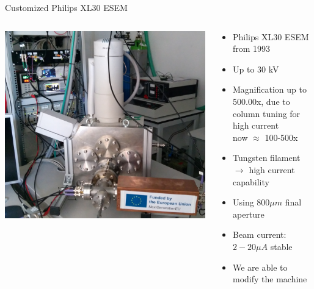 \documentclass[final]{beamer}
\begin{document}
\begin{frame}[fragile]{}
\begin{columns}[T]
\begin{column}{.49\linewidth}
\begin{block}{\Large Customized Philips XL30 ESEM}
		\begin{columns}
			\begin{column}{0.45\columnwidth}
				\includegraphics[width=\columnwidth]{./figures/sematati2_2.png}
			\end{column}
			\begin{column}{0.45\columnwidth}
				\begin{itemize}
					\item Philips XL30 ESEM from 1993
					\item Up to 30 kV
					\item Magnification up to 500.00x, due to column tuning for high current \\ now $\approx$ 100-500x
					\item Tungsten filament $\to$ high current capability
					\item Using $800 \mu m$ final aperture
					\item Beam current: $2 - 20 \mu A$ stable
					\item We are able to modify the machine
				\end{itemize}
			\end{column}
		\end{columns}
		\vspace{1cm}
		\begin{columns}
			\begin{column}{0.225\columnwidth}
				\begin{itemize}

\end{itemize}
\end{column}
\end{columns}
\end{block}
\end{column}
\end{columns}
\end{frame}
\end{document}
